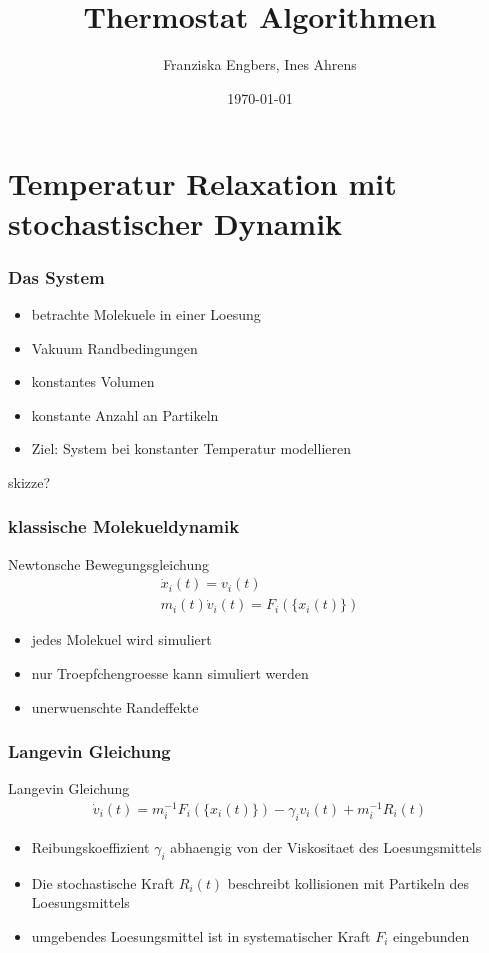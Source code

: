 \documentclass{beamer}
\title{Thermostat Algorithmen}
\author{Franziska Engbers, Ines Ahrens}
\date{\today}
\begin{document}
\maketitle
\frame{\tableofcontents[currentsection]}

\section{Temperatur Relaxation mit stochastischer Dynamik}

\begin{frame}
	\frametitle{Das System}
	\begin{itemize}
		\item betrachte Molekuele in einer Loesung
		\item Vakuum Randbedingungen
		\item konstantes Volumen
		\item konstante Anzahl an Partikeln
		\item Ziel: System bei konstanter Temperatur modellieren		
	\end{itemize}
	skizze?
\end{frame}

\begin{frame} 
  \frametitle{klassische Molekueldynamik}
  \begin{block}{Newtonsche Bewegungsgleichung} 
	\begin{align*}
	\dot{x}_i(t) = v_i(t) \\
	m_i(t) \dot{v}_i(t) = F_i(\{ x_i(t)\}) 
	\end{align*}
  \end{block}
  \begin{itemize}
  	\item jedes Molekuel wird simuliert
  	\item nur Troepfchengroesse kann simuliert werden 
  	\item unerwuenschte Randeffekte
  \end{itemize}
  \end{frame}
  
  \begin{frame}
  \frametitle{Langevin Gleichung}
  \begin{block}{Langevin Gleichung} %
	\begin{align*}
	\dot{v}_i(t)  = m_i^{-1} F_i(\{x_i(t)\}) - \gamma_i v_i(t) + m_i^{-1} R_i(t)
	\end{align*}
  \end{block}  
  \begin{itemize}
  	\item Reibungskoeffizient $\gamma_i$ abhaengig von der Viskositaet des Loesungsmittels
  	\item Die stochastische Kraft $R_i(t)$ beschreibt kollisionen mit Partikeln des Loesungsmittels
  	\item umgebendes Loesungsmittel ist in systematischer Kraft $F_i$ eingebunden
  \end{itemize}
  
\end{frame}
\end{document}
